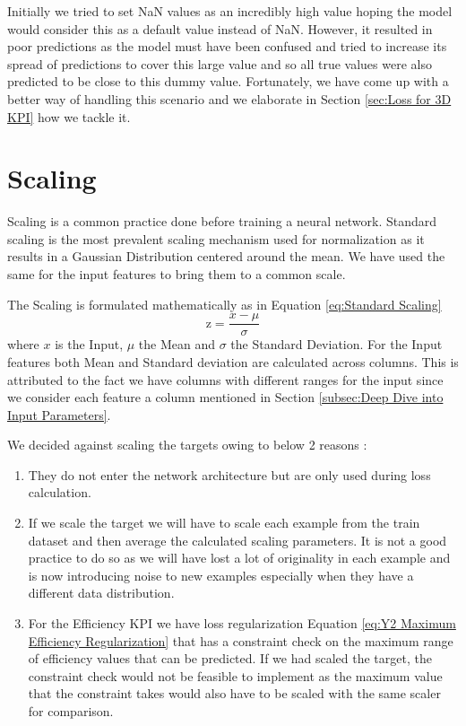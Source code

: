 \documentclass{report} %
\begin{document}
Initially we tried to set \ac{NaN} values as an incredibly high value hoping the model would consider this as a default value instead of \ac{NaN}.
However, it resulted in poor predictions as the model must have been confused and tried to increase its spread of predictions to cover this large value and so all 
true values were also predicted to be close to this dummy value.
Fortunately, we have come up with a better way of handling this scenario and we elaborate in Section \ref{sec:Loss for 3D KPI} how we tackle it.

\section{Scaling}\label{sec:Scaling}

Scaling is a common practice done before training a neural network. 
Standard scaling is the most prevalent scaling mechanism used for normalization as it results in a Gaussian Distribution centered around the mean.
We have used the same for the input features to bring them to a common scale. 

The Scaling is formulated mathematically as in Equation \ref{eq:Standard Scaling}
\begin{equation}
    \text{z} = \frac{x - \mu}{\sigma}
    \label{eq:Standard Scaling}
\end{equation} 
where $x$ is the Input, $\mu$ the Mean and $\sigma$ the Standard Deviation.
For the Input features both Mean and Standard deviation are calculated across columns. 
This is attributed to the fact we have columns with different ranges for the input since we consider each feature a column mentioned in Section \ref{subsec:Deep Dive into Input Parameters}.

We decided against scaling the targets owing to below 2 reasons :
\begin{enumerate}
    \item They do not enter the network architecture but are only used during loss calculation.
    \item If we scale the target we will have to scale each example from the train dataset and then average the calculated scaling parameters.
    It is not a good practice to do so as we will have lost a lot of originality in each example and is now introducing noise to new examples especially when they have a different data distribution.
    \item For the Efficiency \ac{KPI} we have loss regularization Equation \ref{eq:Y2 Maximum Efficiency Regularization} that has a constraint 
    check on the maximum range of efficiency values that can be predicted. If we had scaled the target, the constraint check would not be feasible to 
    implement as the maximum value that the constraint takes would also have to be scaled with the same scaler for comparison.
\end{enumerate}
\end{document}
